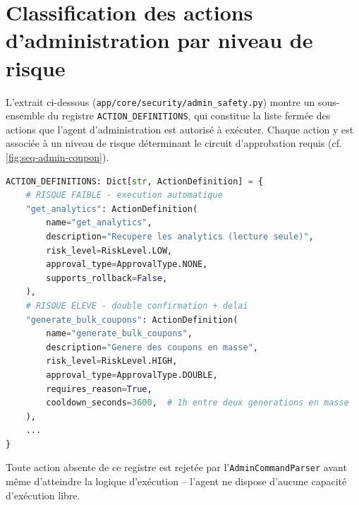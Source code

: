\section{Classification des actions d'administration par niveau de risque}

L'extrait ci-dessous (\texttt{app/core/security/admin\_safety.py}) montre un sous-ensemble du registre \texttt{ACTION\_DEFINITIONS}, qui constitue la liste fermée des actions que l'agent d'administration est autorisé à exécuter. Chaque action y est associée à un niveau de risque déterminant le circuit d'approbation requis (cf. \cref{fig:seq-admin-coupon}).

\begin{lstlisting}[language=Python, caption={Extrait du registre des actions administratives autorisées}]
ACTION_DEFINITIONS: Dict[str, ActionDefinition] = {
    # RISQUE FAIBLE - execution automatique
    "get_analytics": ActionDefinition(
        name="get_analytics",
        description="Recupere les analytics (lecture seule)",
        risk_level=RiskLevel.LOW,
        approval_type=ApprovalType.NONE,
        supports_rollback=False,
    ),
    # RISQUE ELEVE - double confirmation + delai
    "generate_bulk_coupons": ActionDefinition(
        name="generate_bulk_coupons",
        description="Genere des coupons en masse",
        risk_level=RiskLevel.HIGH,
        approval_type=ApprovalType.DOUBLE,
        requires_reason=True,
        cooldown_seconds=3600,  # 1h entre deux generations en masse
    ),
    ...
}
\end{lstlisting}

Toute action absente de ce registre est rejetée par l'\texttt{AdminCommandParser} avant même d'atteindre la logique d'exécution -- l'agent ne dispose d'aucune capacité d'exécution libre.
